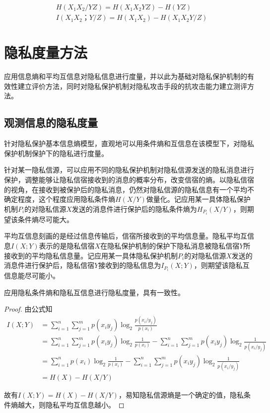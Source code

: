 \begin{equation}
\begin{split}
&H(X_{1}X_{2}/YZ)=H(X_{1}X_{2}YZ)-H(YZ)\\
&I(X_{1}X_{2}；Y/Z)=H(X_{1}X_{2})-H(X_{1}X_{2}Y/Z)
\end{split}
\end{equation}

\section{隐私度量方法}\label{Privacy measures}
应用信息熵和平均互信息对隐私信息进行度量，并以此为基础对隐私保护机制的有效性建立评价方法，同时对隐私保护机制对隐私攻击手段的抗攻击能力建立测评方法。

\subsection{观测信息的隐私度量}

针对隐私保护基本信息熵模型，直观地可以用条件熵和互信息在该模型下，对隐私保护机制保护下的隐私进行度量。

针对某一隐私信源，可以应用不同的隐私保护机制对隐私信源发送的隐私消息进行保护，调整能够让隐私信宿接收到的消息的概率分布，改变信宿的熵。以隐私信宿的视角，在接收到被保护后的隐私消息，仍然对隐私信源的隐私信息有一个平均不确定程度，这个程度应用隐私条件熵$H(X/Y)$做量化。记应用某一具体隐私保护机制$P_{i}$的对隐私信源$X$发送的消息件进行保护后的隐私条件熵为$H_{P_{i}}(X/Y)$，则期望该条件熵尽可能大。

平均互信息刻画的是经过信息传输后，信宿所接收到的平均信息量。隐私平均互信息$I(X;Y)$表示的是隐私信宿$X$在隐私保护机制的保护下隐私消息被隐私信宿$Y$所接收到的平均隐私信息量。记应用某一具体隐私保护机制$P_{i}$的对隐私信源$X$发送的消息件进行保护后，隐私信宿$Y$接收到的隐私信息为$I_{P_{i}}(X;Y)$，则期望该隐私互信息能尽可能小。

\begin{property}
应用隐私条件熵和隐私互信息进行隐私度量，具有一致性。
\end{property}
\begin{proof}
	由公式知
	\begin{equation}
	\begin{split}
	I(X;Y)&=\sum_{i=1}^{n}\sum_{j=1}^{m}p(x_{i}y_{j})\log_{2}\frac{p(x_{i}/y_{j})}{p(x_{i})}\\
	&=\sum_{i=1}^{n}\sum_{j=1}^{m}p(x_{i}y_{j})\log_{2}\frac{1}{p(x_{i})}-\sum_{i=1}^{n}\sum_{j=1}^{m}p(x_{i}y_{j})\log_{2}\frac{1}{p(x_{i}/y_{j})}\\
	&=\sum_{i=1}^{n}p(x_{i})\log_{2}\frac{1}{p(x_{i})}-\sum_{i=1}^{n}\sum_{j=1}^{m}p(x_{i}y_{j})\log_{2}\frac{1}{p(x_{i}/y_{j})}\\
	&=H(X)-H(X/Y)
	\end{split}
	\end{equation}
	
	故有$I(X;Y)=H(X)-H(X/Y)$，易知隐私信源熵是一个确定的值，隐私条件熵越大，则隐私平均互信息越小。
\end{proof}


